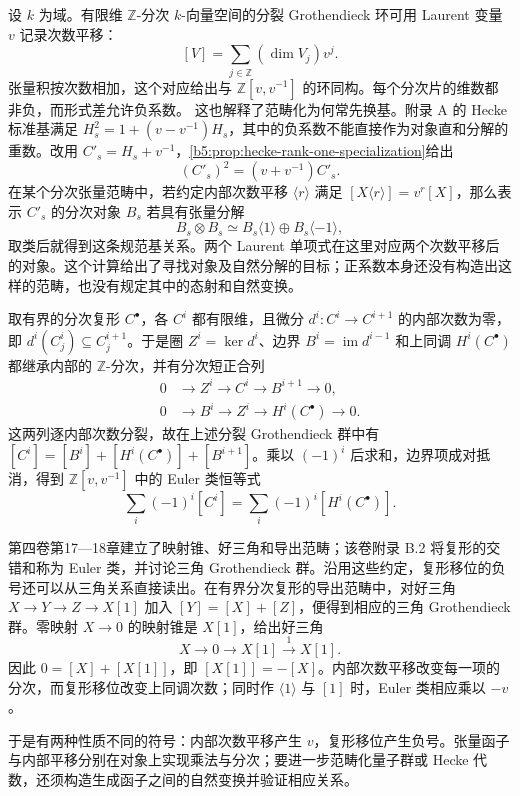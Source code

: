 设 \(k\) 为域。有限维 \(\mathbb Z\)-分次 \(k\)-向量空间的分裂 Grothendieck 环可用 Laurent 变量 \(v\) 记录次数平移：
\[
	[V]=\sum_{j\in\mathbb Z}(\dim V_j)v^j.
\]
张量积按次数相加，这个对应给出与 \(\mathbb Z[v,v^{-1}]\) 的环同构。每个分次片的维数都非负，而形式差允许负系数。
\ProseParagraphBreak
这也解释了范畴化为何常先换基。附录 A 的 Hecke 标准基满足 \(H_s^2=1+(v-v^{-1})H_s\)，其中的负系数不能直接作为对象直和分解的重数。改用 \(C'_s=H_s+v^{-1}\)，\cref{b5:prop:hecke-rank-one-specialization}给出
\[
	(C'_s)^2=(v+v^{-1})C'_s.
\]
在某个分次张量范畴中，若约定内部次数平移 \(\langle r\rangle\) 满足 \([X\langle r\rangle]=v^r[X]\)，那么表示 \(C'_s\) 的分次对象 \(B_s\) 若具有张量分解
\[
	B_s\otimes B_s\simeq B_s\langle1\rangle\oplus B_s\langle-1\rangle,
\]
取类后就得到这条规范基关系。两个 Laurent 单项式在这里对应两个次数平移后的对象。这个计算给出了寻找对象及自然分解的目标；正系数本身还没有构造出这样的范畴，也没有规定其中的态射和自然变换。

\ProseParagraphBreak
取有界的分次复形 \(C^\bullet\)，各 \(C^i\) 都有限维，且微分 \(d^i:C^i\to C^{i+1}\) 的内部次数为零，即 \(d^i(C^i_j)\subseteq C^{i+1}_j\)。于是圈 \(Z^i=\ker d^i\)、边界 \(B^i=\operatorname{im}d^{i-1}\) 和上同调 \(H^i(C^\bullet)\) 都继承内部的 \(\mathbb Z\)-分次，并有分次短正合列
\[
	\begin{aligned}
		0&\longrightarrow Z^i\longrightarrow C^i\longrightarrow B^{i+1}\longrightarrow0,\\
		0&\longrightarrow B^i\longrightarrow Z^i\longrightarrow H^i(C^\bullet)\longrightarrow0.
	\end{aligned}
\]
这两列逐内部次数分裂，故在上述分裂 Grothendieck 群中有 \([C^i]=[B^i]+[H^i(C^\bullet)]+[B^{i+1}]\)。乘以 \((-1)^i\) 后求和，边界项成对抵消，得到 \(\mathbb Z[v,v^{-1}]\) 中的 Euler 类恒等式
\[
	\sum_i(-1)^i[C^i]=\sum_i(-1)^i[H^i(C^\bullet)].
\]

\ProseParagraphBreak
第四卷第17—18章建立了映射锥、好三角和导出范畴；该卷附录 B.2 将复形的交错和称为 Euler 类，并讨论三角 Grothendieck 群。沿用这些约定，复形移位的负号还可以从三角关系直接读出。在有界分次复形的导出范畴中，对好三角 \(X\to Y\to Z\to X[1]\) 加入 \([Y]=[X]+[Z]\)，便得到相应的三角 Grothendieck 群。零映射 \(X\to0\) 的映射锥是 \(X[1]\)，给出好三角
\[
	X\longrightarrow0\longrightarrow X[1]\xrightarrow{1}X[1].
\]
因此 \(0=[X]+[X[1]]\)，即 \([X[1]]=-[X]\)。内部次数平移改变每一项的分次，而复形移位改变上同调次数；同时作 \(\langle1\rangle\) 与 \([1]\) 时，Euler 类相应乘以 \(-v\)。

\ProseParagraphBreak
于是有两种性质不同的符号：内部次数平移产生 \(v\)，复形移位产生负号。张量函子与内部平移分别在对象上实现乘法与分次；要进一步范畴化量子群或 Hecke 代数，还须构造生成函子之间的自然变换并验证相应关系。
